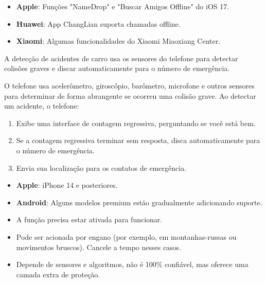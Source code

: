 
\begin{itemize}
  \item \textbf{Apple}: Funções "NameDrop" e "Buscar Amigos Offline" do iOS 17.
  \item \textbf{Huawei}: App ChangLian suporta chamadas offline.
  \item \textbf{Xiaomi}: Algumas funcionalidades do Xiaomi Miaoxiang Center.
\end{itemize}


A detecção de acidentes de carro usa os sensores do telefone para detectar colisões graves e discar automaticamente para o número de emergência.


O telefone usa acelerômetro, giroscópio, barômetro, microfone e outros sensores para determinar de forma abrangente se ocorreu uma colisão grave. Ao detectar um acidente, o telefone:

\begin{enumerate}
  \item Exibe uma interface de contagem regressiva, perguntando se você está bem.
  \item Se a contagem regressiva terminar sem resposta, disca automaticamente para o número de emergência.
  \item Envia sua localização para os contatos de emergência.
\end{enumerate}


\begin{itemize}
  \item \textbf{Apple}: iPhone 14 e posteriores.
  \item \textbf{Android}: Alguns modelos premium estão gradualmente adicionando suporte.
\end{itemize}


\begin{itemize}
  \item A função precisa estar ativada para funcionar.
  \item Pode ser acionada por engano (por exemplo, em montanhas-russas ou movimentos bruscos). Cancele a tempo nesses casos.
  \item Depende de sensores e algoritmos, não é 100\% confiável, mas oferece uma camada extra de proteção.
\end{itemize}

